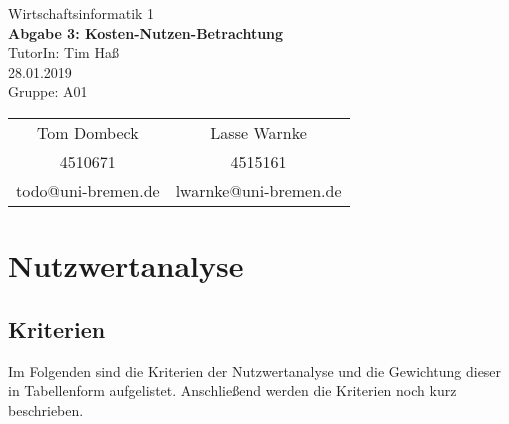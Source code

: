 \documentclass[12pt,utf8]{scrartcl}
\makeatletter
\newcommand{\teilnehmerI}{Tom Dombeck}
\newcommand{\mattI}{4510671}
\newcommand{\mailI}{todo@uni-bremen.de}
\newcommand{\teilnehmerII}{Lasse Warnke}
\newcommand{\mattII}{4515161}
\newcommand{\mailII}{lwarnke@uni-bremen.de}
\newcommand{\thisgroup}{A01}
\newcommand{\abgabedatum}{28.01.2019}
\newcommand{\nummer}{3}
\newcommand{\thema}{Kosten-Nutzen-Betrachtung}
\newcommand{\thistutor}{Tim Haß}
\newcommand{\thiscourse}{Wirtschaftsinformatik 1}
\makeatother
\begin{document}
\setlength{\parindent}{0em}

\begin{titlepage}
	\vspace*{\baselineskip}			%
	\centering						%
	\LARGE							%
	\thiscourse \\ 					%
	\vspace{1cm}					%
	{\Huge 							%
	\textbf{Abgabe \nummer: \thema}} \\ %
	\vspace{1.5cm} 					%
	TutorIn: \thistutor \\ 			%
	\abgabedatum \\ 				%
	\vfill 							%
	Gruppe: \thisgroup \\ 			%
	\vspace{.5cm} 					%
	\large 							%
	\begin{tabular}{c|c} 			%
	\teilnehmerI	& \teilnehmerII \\ %
	\mattI	& \mattII \\ %
	\mailI	& \mailII \\ %
	\end{tabular}
\end{titlepage}

\thispagestyle{empty}
\tableofcontents

\newpage
\setcounter{page}{1} %

\section*{Nutzwertanalyse}

\subsection*{Kriterien}

Im Folgenden sind die Kriterien der Nutzwertanalyse und die Gewichtung dieser in Tabellenform aufgelistet. Anschließend werden die Kriterien noch kurz beschrieben.
\end{document}
